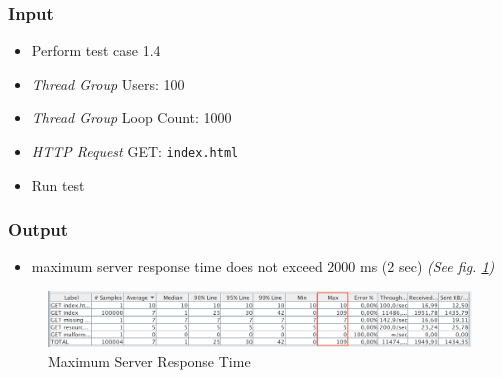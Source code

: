 \documentclass[a4paper, 12pt]{article}
\begin{document}
\subsubsection{Input}
\begin{itemize}
\item Perform test case 1.4
\item \textit{Thread Group} Users: 100
\item \textit{Thread Group} Loop Count: 1000
\item \textit{HTTP Request} GET: \texttt{index.html}
\item Run test
\end{itemize}

\subsubsection{Output}
\begin{itemize}
\item maximum server response time does not exceed 2000 ms (2 sec) \textit{(See fig. \ref{TC4.1})}
\end{itemize}

\begin{figure}[H]
\includegraphics[scale=0.5]{output_clarification/HighLoad.png} 
\caption{Maximum Server Response Time}
\label{TC4.1}
\end{figure}
\end{document}
